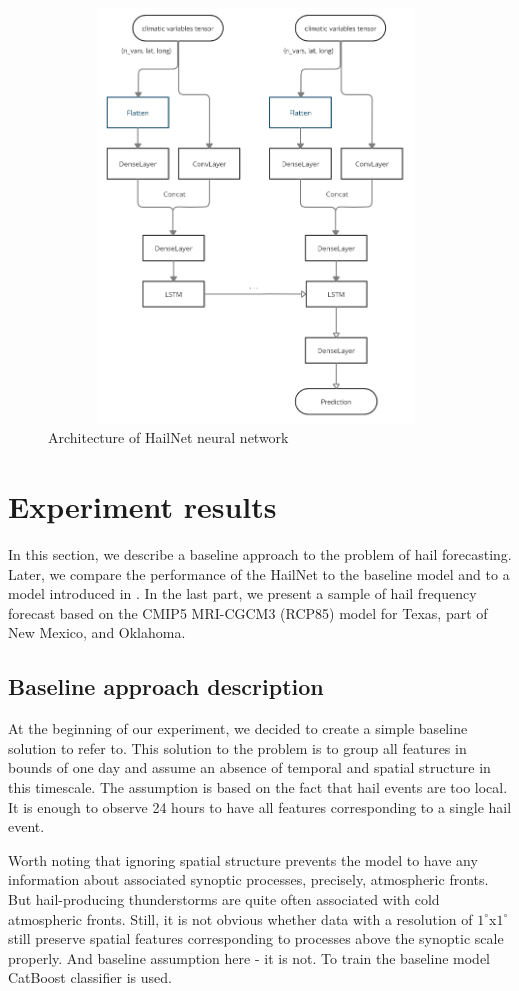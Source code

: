\documentclass[conference]{IEEEtran}
\begin{document}
\begin{figure}[htbp]
\centerline{\includegraphics[width=11cm,height=11cm,keepaspectratio]{HailNet2.png}}
\caption{Architecture of HailNet neural network}
\label{fig: HailNet2.png}
\end{figure}


\section{Experiment results}

In this section, we describe a baseline approach to the problem of hail forecasting. Later, we compare the performance of the HailNet to the baseline model and to a model introduced in  \cite{PREIN201810}. In the last part, we present a sample of hail frequency forecast based on the CMIP5 MRI-CGCM3 (RCP85) model for Texas, part of New Mexico, and Oklahoma.
\subsection{Baseline approach description}
At the beginning of our experiment, we decided to create a simple baseline solution to refer to. This solution to the problem is to group all features in bounds of one day and assume an absence of temporal and spatial structure in this timescale. The assumption is based on the fact that hail events are too local. It is enough to observe 24 hours to have all features corresponding to a single hail event. 

Worth noting that ignoring spatial structure prevents the model to have any information about associated synoptic processes, precisely, atmospheric fronts. But hail-producing thunderstorms are quite often associated with cold atmospheric fronts. Still, it is not obvious whether data with a resolution of $1^{\circ}$x$1^{\circ}$ still preserve spatial features corresponding to processes above the synoptic scale properly. And baseline assumption here - it is not. To train the baseline model CatBoost classifier \cite{dorogush2018catboost} is used. 
\end{document}
